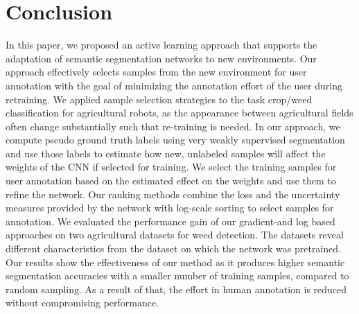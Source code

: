 \documentclass[letterpaper, 10 pt, conference]{ieeeconf}  %
\begin{document}
\section{Conclusion}
\label{sec:conclusion}

In this paper, we proposed an active learning approach that supports the adaptation
of semantic segmentation networks to  new environments. Our approach  effectively 
selects samples from the new environment for user annotation with the goal of 
minimizing the annotation effort of the user during retraining.
We applied  sample selection strategies to the task crop/weed classification for agricultural robots,
as the appearance between agricultural fields often change substantially such that
re-training is needed. 
In our approach, we compute pseudo ground truth labels using very weakly supervised 
segmentation and use those labels to estimate how new, unlabeled samples will 
affect the weights of the CNN if selected for training. We select the training
samples for user annotation based on the estimated effect on the weights and use them to refine the 
network. Our ranking methods combine the loss and the uncertainty measures provided by the network with 
log-scale sorting to select samples for annotation.
We evaluated  the performance gain of our gradient-and log based 
approaches on two agricultural  datasets for weed detection. The datasets 
reveal different characteristics from the dataset on which the network was pretrained.
Our results show the effectiveness of our method as it produces higher semantic segmentation
accuracies with a smaller number of training samples, compared to random sampling. As a result
of that, the effort in human annotation is reduced without compromising
performance.
 
\clearpage



\end{document}

